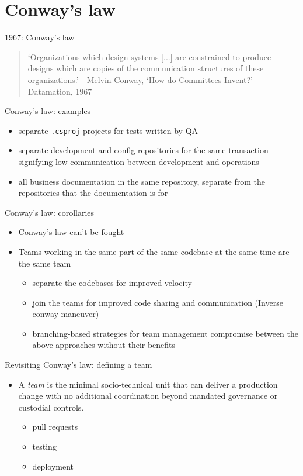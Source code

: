 \documentclass{beamer}
\begin{document}
	\section{Conway's law}
	\begin{frame}{1967: Conway's law}
		\begin{quote}
			`Organizations which design systems [...] are constrained to produce designs which are copies of the communication structures of these organizations.' - Melvin Conway, `How do Committees Invent?' Datamation, 1967
		\end{quote}
	\end{frame}
	\begin{frame}{Conway's law: examples}
		\begin{itemize}
			\item separate \texttt{.csproj} projects for tests written by QA 
			\item separate development and config repositories for the same transaction signifying low communication between development and operations 
			\item all business documentation in the same repository, separate from the repositories that the documentation is for 
		\end{itemize}
	\end{frame}
	\begin{frame}{Conway's law: corollaries}
		\begin{itemize}
			\item Conway's law can't be fought \pause
			\item Teams working in the same part of the same codebase at the same time are the same team \pause
			\begin{itemize}
				\item separate the codebases for improved velocity \pause
				\item join the teams for improved code sharing and communication (Inverse conway maneuver) \pause 
				\item branching-based strategies for team management compromise between the above approaches without their benefits
			\end{itemize}
		\end{itemize}
	\end{frame}
	\begin{frame}{Revisiting Conway's law: defining a team}
		\begin{itemize}
			\item A \textit{team} is the minimal socio-technical unit that can deliver a production change with no additional coordination beyond mandated governance or custodial controls. \pause
			\begin{itemize}
				\item pull requests \pause
				\item testing \pause
				\item deployment \pause
			\end{itemize}
		\end{itemize}
	\end{frame}
	
\end{document}
